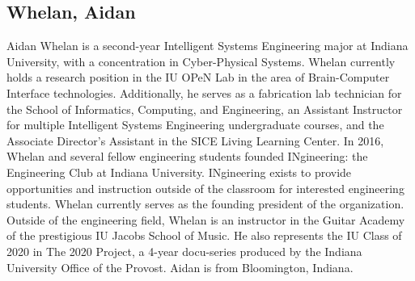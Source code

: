 \subsection{Whelan, Aidan}
Aidan Whelan is a second-year Intelligent Systems Engineering major at Indiana University, with a concentration in Cyber-Physical Systems. Whelan currently holds a research position in the IU OPeN Lab in the area of Brain-Computer Interface technologies. Additionally, he serves as a fabrication lab technician for the School of Informatics, Computing, and Engineering, an Assistant Instructor for multiple Intelligent Systems Engineering undergraduate courses, and the Associate Director's Assistant in the SICE Living Learning Center. In 2016, Whelan and several fellow engineering students founded INgineering: the Engineering Club at Indiana University. INgineering exists to provide opportunities and instruction outside of the classroom for interested engineering students. Whelan currently serves as the founding president of the organization. Outside of the engineering field, Whelan is an instructor in the Guitar Academy of the prestigious IU Jacobs School of Music. He also represents the IU Class of 2020 in The 2020 Project, a 4-year docu-series produced by the Indiana University Office of the Provost. Aidan is from Bloomington, Indiana.
